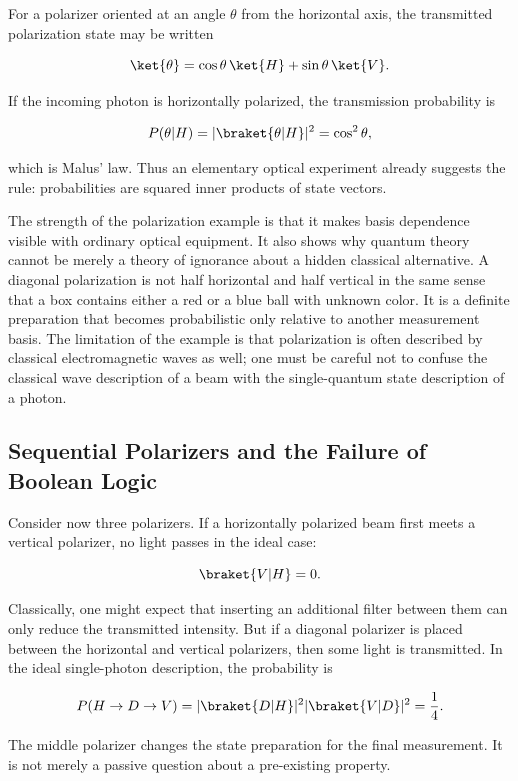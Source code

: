For a polarizer oriented at an angle $\theta$ from the horizontal axis, the transmitted polarization state may be written
\begin{linenomath}
    \begin{equation}
        \ket{\theta}=\cos\theta\,\ket{H}+\sin\theta\,\ket{V}.
    \end{equation}
\end{linenomath}
If the incoming photon is horizontally polarized, the transmission probability is
\begin{linenomath}
    \begin{equation}
        P(\theta|H)=|\braket{\theta|H}|^2=\cos^2\theta,
    \end{equation}
\end{linenomath}
which is Malus' law. Thus an elementary optical experiment already suggests the rule: probabilities are squared inner products of state vectors.

The strength of the polarization example is that it makes basis dependence visible with ordinary optical equipment. It also shows why quantum theory cannot be merely a theory of ignorance about a hidden classical alternative. A diagonal polarization is not half horizontal and half vertical in the same sense that a box contains either a red or a blue ball with unknown color. It is a definite preparation that becomes probabilistic only relative to another measurement basis. The limitation of the example is that polarization is often described by classical electromagnetic waves as well; one must be careful not to confuse the classical wave description of a beam with the single-quantum state description of a photon.

\subsection{Sequential Polarizers and the Failure of Boolean Logic}
Consider now three polarizers. If a horizontally polarized beam first meets a vertical polarizer, no light passes in the ideal case:
\begin{linenomath}
    \begin{equation}
        \braket{V|H}=0.
    \end{equation}
\end{linenomath}
Classically, one might expect that inserting an additional filter between them can only reduce the transmitted intensity. But if a diagonal polarizer is placed between the horizontal and vertical polarizers, then some light is transmitted. In the ideal single-photon description, the probability is
\begin{linenomath}
    \begin{equation}
        P(H\to D\to V)
        =
        |\braket{D|H}|^2|\braket{V|D}|^2
        =
        \frac14.
    \end{equation}
\end{linenomath}
The middle polarizer changes the state preparation for the final measurement. It is not merely a passive question about a pre-existing property.

